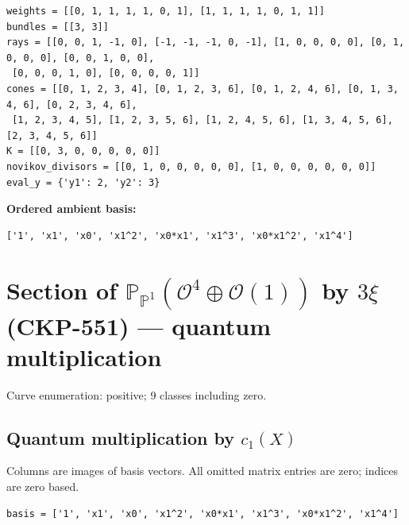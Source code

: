 \documentclass[10pt,a4paper]{article}
\begin{document}
\begin{lstlisting}
weights = [[0, 1, 1, 1, 1, 0, 1], [1, 1, 1, 1, 0, 1, 1]]
bundles = [[3, 3]]
rays = [[0, 0, 1, -1, 0], [-1, -1, -1, 0, -1], [1, 0, 0, 0, 0], [0, 1, 0, 0, 0], [0, 0, 1, 0, 0],
 [0, 0, 0, 1, 0], [0, 0, 0, 0, 1]]
cones = [[0, 1, 2, 3, 4], [0, 1, 2, 3, 6], [0, 1, 2, 4, 6], [0, 1, 3, 4, 6], [0, 2, 3, 4, 6],
 [1, 2, 3, 4, 5], [1, 2, 3, 5, 6], [1, 2, 4, 5, 6], [1, 3, 4, 5, 6], [2, 3, 4, 5, 6]]
K = [[0, 3, 0, 0, 0, 0, 0]]
novikov_divisors = [[0, 1, 0, 0, 0, 0, 0], [1, 0, 0, 0, 0, 0, 0]]
eval_y = {'y1': 2, 'y2': 3}
\end{lstlisting}

\textbf{Ordered ambient basis:}
\begin{lstlisting}
['1', 'x1', 'x0', 'x1^2', 'x0*x1', 'x1^3', 'x0*x1^2', 'x1^4']
\end{lstlisting}

\clearpage\section*{Section of $\mathbb P_{\mathbb P^{1}}(\mathcal O^{4}\oplus \mathcal O(1))$ by $3\xi $ (CKP-551) --- quantum multiplication}

Curve enumeration: positive; 9 classes including zero.
\subsection*{Quantum multiplication by $c_1(X)$}
Columns are images of basis vectors. All omitted matrix entries are zero; indices are zero based.

\begin{lstlisting}
basis = ['1', 'x1', 'x0', 'x1^2', 'x0*x1', 'x1^3', 'x0*x1^2', 'x1^4']
\end{lstlisting}
\end{document}
